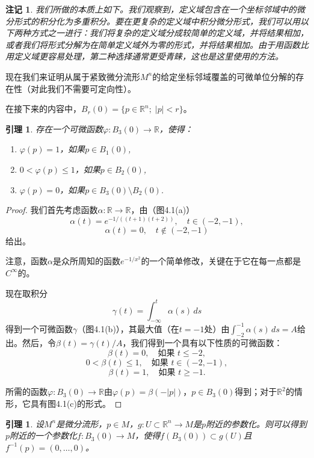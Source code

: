 \documentclass[12pt,a4paper]{ctexbook}
\newtheorem{lemma}[theorem]{引理}
\newtheorem{remark}[theorem]{注记}
\begin{document}
\begin{remark}
我们所做的本质上如下。我们观察到，定义域包含在一个坐标邻域中的微分形式的积分化为多重积分。要在更复杂的定义域中积分微分形式，我们可以用以下两种方式之一进行：我们将复杂的定义域分成较简单的定义域，并将结果相加，或者我们将形式分解为在简单定义域外为零的形式，并将结果相加。由于用函数比用定义域更容易处理，第二种选择通常更受青睐，这也是这里使用的方法。
\end{remark}

现在我们来证明从属于紧致微分流形$M^n$的给定坐标邻域覆盖的可微单位分解的存在性（对此我们不需要可定向性）。

在接下来的内容中，$B_r(0) = \{p\in\mathbb{R}^n;\; |p|<r\}$。

\begin{lemma}
存在一个可微函数$\varphi: B_3(0)\to\mathbb{R}$，使得：
\begin{enumerate}[label=\alph*)]
    \item $\varphi(p) = 1$，如果$p\in B_1(0)$,
    \item $0 < \varphi(p) \leq 1$，如果$p\in B_2(0)$,
    \item $\varphi(p) = 0$，如果$p\in B_3(0)\setminus B_2(0)$.
\end{enumerate}
\end{lemma}

\begin{proof}
我们首先考虑函数$\alpha:\mathbb{R}\to\mathbb{R}$，由（图4.1(a)）
$$\alpha(t) = e^{-1/((t+1)(t+2))},\quad t\in(-2,-1),$$
$$\alpha(t) = 0,\quad t\notin(-2,-1)$$
给出。

注意，函数$\alpha$是众所周知的函数$e^{-1/x^2}$的一个简单修改，关键在于它在每一点都是$C^\infty$的。

现在取积分
$$\gamma(t) = \int_{-\infty}^t \alpha(s)\,ds$$
得到一个可微函数$\gamma$（图4.1(b)），其最大值（在$t=-1$处）由$\int_{-2}^{-1} \alpha(s)\,ds = A$给出。然后，令$\beta(t) = \gamma(t)/A$，我们得到一个具有以下性质的可微函数：
$$\beta(t) = 0,\quad \text{如果 } t\leq -2,$$
$$0 < \beta(t) \leq 1,\quad \text{如果 } t\in(-2,-1),$$
$$\beta(t) = 1,\quad \text{如果 } t\geq -1.$$

所需的函数$\varphi: B_3(0)\to\mathbb{R}$由$\varphi(p) = \beta(-|p|)$，$p\in B_3(0)$得到；对于$\mathbb{R}^2$的情形，它具有图4.1(c)的形式。
\end{proof}

\begin{lemma}
设$M^n$是微分流形，$p\in M$，$g:U\subset\mathbb{R}^n\to M$是$p$附近的参数化。则可以得到$p$附近的一个参数化$f:B_3(0)\to M$，使得$f(B_3(0))\subset g(U)$且$f^{-1}(p) = (0,\ldots,0)$。
\end{lemma}
\end{document}
